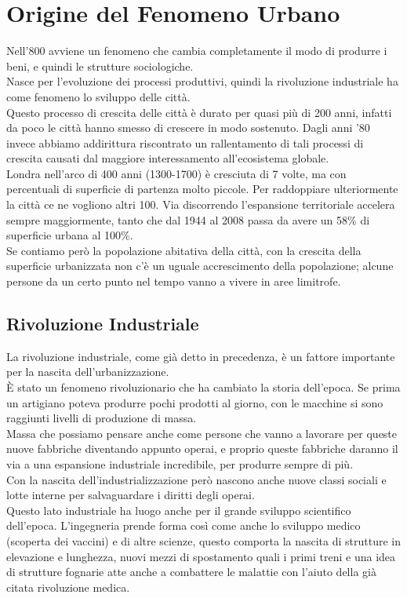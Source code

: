 \documentclass[a4paper,12pt, oneside]{book}
\begin{document}
  \chapter{Origine del Fenomeno Urbano}
    Nell'800 avviene un fenomeno che cambia completamente il modo di produrre i beni, e quindi le strutture sociologiche.\\
    Nasce per l'evoluzione dei processi produttivi, quindi la rivoluzione industriale ha come fenomeno lo sviluppo delle città.\\
    Questo processo di crescita delle città è durato per quasi più di 200 anni, infatti da poco le città hanno smesso di crescere in modo sostenuto. Dagli anni '80 invece abbiamo addirittura riscontrato un rallentamento di tali processi di crescita causati dal maggiore interessamento all'ecosistema globale.\\
    Londra nell'arco di 400 anni (1300-1700) è cresciuta di 7 volte, ma con percentuali di superficie di partenza molto piccole. Per raddoppiare ulteriormente la città ce ne vogliono altri 100. Via discorrendo l'espansione territoriale accelera sempre maggiormente, tanto che dal 1944 al 2008 passa da avere un 58\% di superficie urbana al 100\%.\\
    Se contiamo però la popolazione abitativa della città, con la crescita della superficie urbanizzata non c'è un uguale accrescimento della popolazione; alcune persone da un certo punto nel tempo vanno a vivere in aree limitrofe.\\
    \section{Rivoluzione Industriale}
    La rivoluzione industriale, come già detto in precedenza, è un fattore importante per la nascita dell'urbanizzazione.\\
    È stato un fenomeno rivoluzionario che ha cambiato la storia dell'epoca. Se prima un artigiano poteva produrre pochi prodotti al giorno, con le macchine si sono raggiunti livelli di produzione di massa.\\
    Massa che possiamo pensare anche come persone che vanno a lavorare per queste nuove fabbriche diventando appunto operai, e proprio queste fabbriche daranno il via a una espansione industriale incredibile, per produrre sempre di più.\\
    Con la nascita dell'industrializzazione però nascono anche nuove classi sociali e lotte interne per salvaguardare i diritti degli operai.\\
    Questo lato industriale ha luogo anche per il grande sviluppo scientifico dell'epoca. L'ingegneria prende forma così come anche lo sviluppo medico (scoperta dei vaccini) e di altre scienze, questo comporta la nascita di strutture in elevazione e lunghezza, nuovi mezzi di spostamento quali i primi treni e una idea di strutture fognarie atte anche a combattere le malattie con l'aiuto della già citata rivoluzione medica.\\
\end{document}
